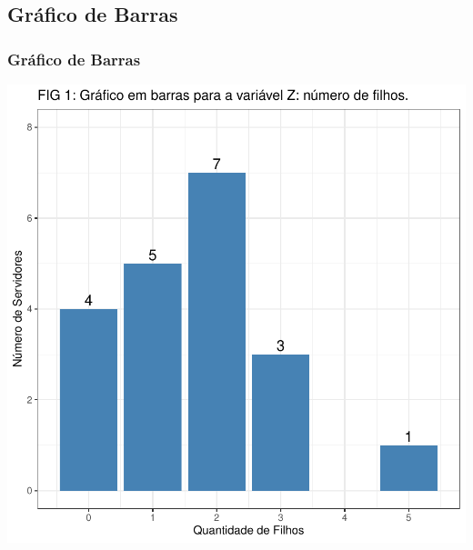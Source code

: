 \documentclass[14pt,aspectratio=1610]{beamer}
\begin{document}

\subsection{Gráfico de Barras}
\begin{frame}{}
\frametitle{Gráfico de Barras}
\begin{block}{}
\begin{center}
\includegraphics{Aula5-bar1}
\end{center}
\end{block}
\end{frame}
\end{document}
